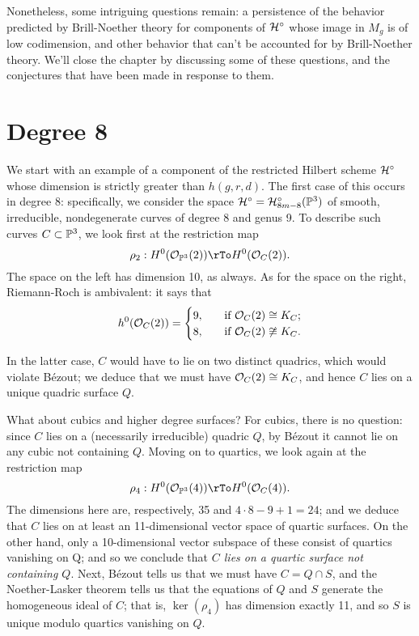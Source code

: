 
Nonetheless, some intriguing questions remain: a persistence of the behavior predicted by Brill-Noether theory for components of $\cH^\circ$ whose image in $M_g$ is of low codimension, and other behavior that can't be accounted for by Brill-Noether theory. We'll close the chapter by discussing some of these questions, and the conjectures that have been made in response to them.


\section{Degree 8}

We start with an example of a component of the restricted Hilbert scheme $\cH^\circ$ whose dimension is strictly greater than $h(g,r,d)$.
The first case of this  occurs in degree 8: specifically, we consider the space $\cH^\circ = \cH^\circ_{8m-8}(\PP^3)$ of smooth, irreducible, nondegenerate curves of degree 8 and genus 9. To describe such curves $C \subset \PP^3$, we look first at the restriction map
$$
\rho_2 : H^0(\cO_{\PP^3}(2)) \rTo H^0(\cO_C(2)).
$$
The space on the left has dimension 10, as always. As for the space on the right, Riemann-Roch is ambivalent: it says that
\begin{align*}
h^0(\cO_C(2)) =
\begin{cases}
9, \quad &\text{if } \cO_C(2) \cong K_C; \\
8,  \quad &\text{if } \cO_C(2) \not\cong K_C.
\end{cases}
\end{align*}

In the latter case, $C$ would have to lie on two distinct quadrics, which would violate B\'ezout; we deduce that we must have $\cO_C(2) \cong K_C$, and hence $C$ lies on a unique quadric surface $Q$.

What about cubics and higher degree surfaces? For cubics, there is no question: since $C$ lies on a (necessarily irreducible) quadric $Q$, by B\'ezout it cannot lie on any cubic not containing $Q$. Moving on to quartics, we look again at the restriction map
$$
\rho_4 : H^0(\cO_{\PP^3}(4)) \rTo H^0(\cO_C(4)).
$$
The dimensions here are, respectively, 35 and $4\cdot 8 - 9 + 1 = 24$; and we deduce that $C$ lies on at least an 11-dimensional vector space of quartic surfaces. On the other hand, only a 10-dimensional vector subspace of these consist of quartics vanishing on Q; and so we conclude that \emph{$C$ lies on a quartic surface not containing $Q$}. Next, B\'ezout tells us that we must have $C = Q \cap S$, and the Noether-Lasker theorem tells us that the equations of $Q$ and $S$ generate the homogeneous ideal of $C$; that is, $\ker(\rho_4)$ has dimension exactly 11, and so $S$ is unique modulo quartics vanishing on $Q$.

